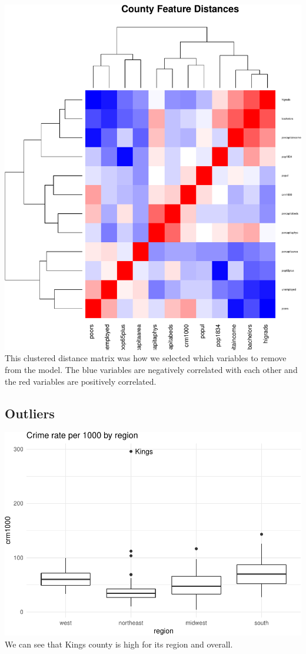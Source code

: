 \documentclass[]{article}
\begin{document}
\includegraphics{project_files/figure-latex/unnamed-chunk-25-1.pdf} This
clustered distance matrix was how we selected which variables to remove
from the model. The blue variables are negatively correlated with each
other and the red variables are positively correlated.

\subsection{Outliers}\label{outliers-1}

\includegraphics{project_files/figure-latex/unnamed-chunk-26-1.pdf} We
can see that Kings county is high for its region and overall.



\end{document}
